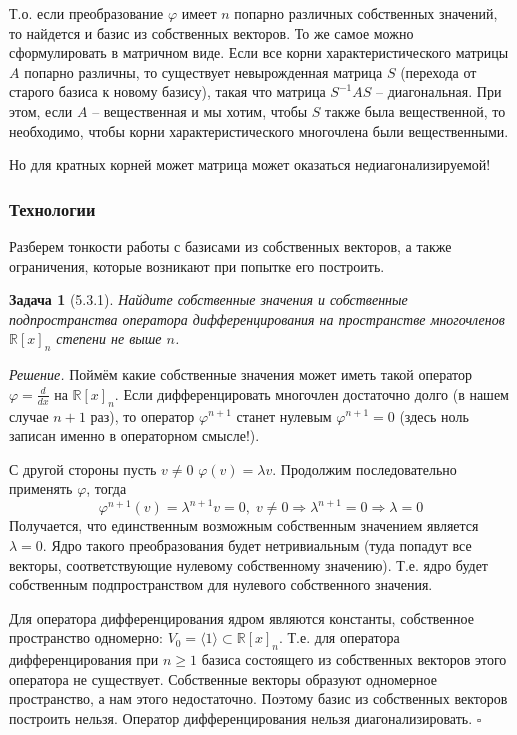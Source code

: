\documentclass[a4paper,12pt]{article}
\newtheorem*{prob}{Задача}
\newenvironment{soln}{\noindent\textit{Решение.}}{\hfill$\square$}
\begin{document}
Т.о. если преобразование $\varphi$ имеет $n$ попарно различных собственных значений, то найдется и базис из собственных векторов. То же самое можно сформулировать в матричном виде. Если все корни характеристического матрицы $A$ попарно различны, то существует невырожденная матрица $S$ (перехода от старого базиса к новому базису), такая что матрица $S^{-1} A S$ -- диагональная. При этом, если $A$ -- вещественная и мы хотим, чтобы $S$ также была вещественной, то необходимо, чтобы корни характеристического многочлена были вещественными.

Но для кратных корней может матрица может оказаться недиагонализируемой! 

\subsubsection{Технологии}

Разберем тонкости работы с базисами из собственных векторов, а также ограничения, которые возникают при попытке его построить.

\begin{prob}[5.3.1]
	Найдите собственные значения и собственные подпространства оператора дифференцирования на пространстве многочленов $\mathbb{R}[x]_n$ степени не выше $n$.
\end{prob}
\begin{soln}
	Поймём какие собственные значения может иметь такой оператор $\varphi = \frac{d}{dx}$ на $\mathbb{R}[x]_n$. Если дифференцировать многочлен достаточно долго (в нашем случае $n+1$ раз), то оператор $\varphi^{n+1}$ станет нулевым $\varphi^{n+1} = 0$ (здесь ноль записан именно в операторном смысле!).
	
	С другой стороны пусть $v \ne 0$ $\varphi(v) = \lambda v$. Продолжим последовательно применять $\varphi$, тогда
	\[
	 	\varphi^{n+1} (v) = \lambda^{n+1} v = 0, \; v \ne 0 \Rightarrow \lambda^{n+1} = 0 \Rightarrow \lambda = 0
	\]
	Получается, что единственным возможным собственным значением является $\lambda = 0$. Ядро такого преобразования будет нетривиальным (туда попадут все векторы, соответствующие нулевому собственному значению). Т.е. ядро будет собственным подпространством для нулевого собственного значения. 
	
	Для оператора дифференцирования ядром являются константы, собственное пространство одномерно: $V_0 = \langle 1 \rangle \subset \mathbb{R}[x]_n$. Т.е. для оператора дифференцирования при $n \ge 1$ базиса состоящего из собственных векторов этого оператора не существует. Собственные векторы образуют одномерное пространство, а нам этого недостаточно. Поэтому базис из собственных векторов построить нельзя. Оператор дифференцирования нельзя диагонализировать.
\end{soln}
\end{document}
